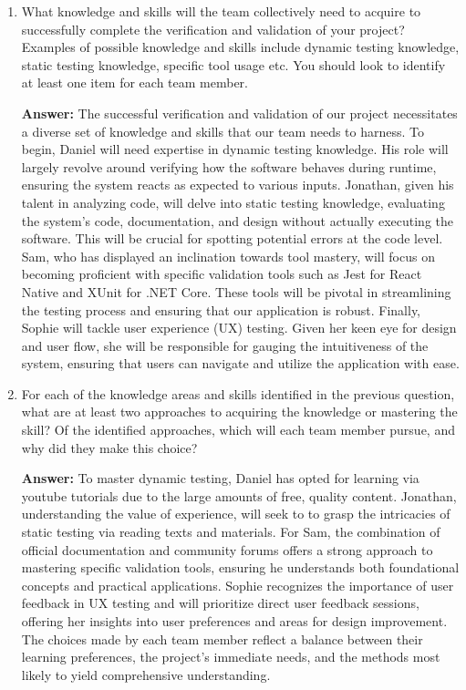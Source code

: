\documentclass[12pt, titlepage]{article}
\begin{document}
    \begin{enumerate}
        \item What knowledge and skills will the team collectively need to acquire to successfully complete the verification and validation of your project? Examples of possible knowledge and skills include dynamic testing knowledge, static testing knowledge, specific tool usage etc. You should look to identify at least one item for each team member.

        \textbf{Answer:}
        The successful verification and validation of our project necessitates a diverse set of knowledge and skills that our team needs to harness. To begin, Daniel will need expertise in dynamic testing knowledge. His role will largely revolve around verifying how the software behaves during runtime, ensuring the system reacts as expected to various inputs. Jonathan, given his talent in analyzing code, will delve into static testing knowledge, evaluating the system's code, documentation, and design without actually executing the software. This will be crucial for spotting potential errors at the code level. Sam, who has displayed an inclination towards tool mastery, will focus on becoming proficient with specific validation tools such as Jest for React Native and XUnit for .NET Core. These tools will be pivotal in streamlining the testing process and ensuring that our application is robust. Finally, Sophie will tackle user experience (UX) testing. Given her keen eye for design and user flow, she will be responsible for gauging the intuitiveness of the system, ensuring that users can navigate and utilize the application with ease.

        \item For each of the knowledge areas and skills identified in the previous question, what are at least two approaches to acquiring the knowledge or mastering the skill? Of the identified approaches, which will each team member pursue, and why did they make this choice?

        \textbf{Answer:}
        To master dynamic testing, Daniel has opted for learning via youtube tutorials due to the large amounts of free, quality content. Jonathan, understanding the value of experience, will seek to to grasp the intricacies of static testing via reading texts and materials. For Sam, the combination of official documentation and community forums offers a strong approach to mastering specific validation tools, ensuring he understands both foundational concepts and practical applications. Sophie recognizes the importance of user feedback in UX testing and will prioritize direct user feedback sessions, offering her  insights into user preferences and areas for design improvement. The choices made by each team member reflect a balance between their learning preferences, the project's immediate needs, and the methods most likely to yield comprehensive understanding.
    \end{enumerate}
\end{document}
